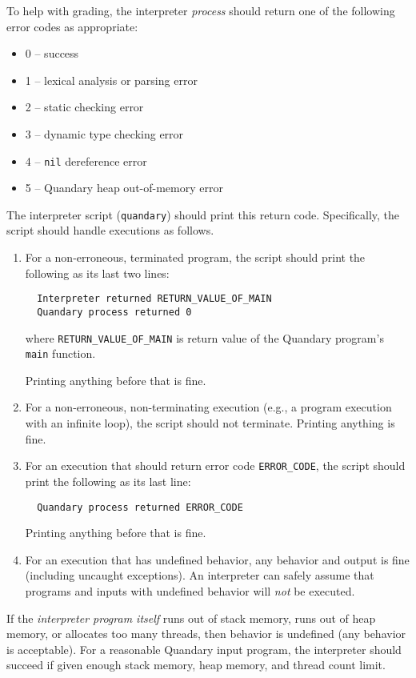 \documentclass[10pt]{article}
\newcommand{\tm}[1]{\texttt{#1}}
\begin{document}
To help with grading, the interpreter \emph{process} should return one of the following error codes as appropriate:

\begin{itemize}
\item 0 -- success
\item 1 -- lexical analysis or parsing error
\item 2 -- static checking error
\item 3 -- dynamic type checking error
\item 4 -- \tm{nil} dereference error
\item 5 -- Quandary heap out-of-memory error
\end{itemize}
The interpreter script (\texttt{quandary}) should print this return code.
Specifically, the script should handle executions as follows.

\begin{enumerate}

\item For a non-erroneous, terminated program,
the script should print the following as its last two lines:
\begin{verbatim}
  Interpreter returned RETURN_VALUE_OF_MAIN
  Quandary process returned 0
\end{verbatim}
where \texttt{RETURN\_VALUE\_OF\_MAIN} is return value of the Quandary program's \texttt{main} function.

Printing anything before that is fine.

\item For a non-erroneous, non-terminating execution (e.g., a program execution with an infinite loop),
the script should not terminate. Printing anything is fine.

\item For an execution that should return error code \texttt{ERROR\_CODE},
the script should print the following as its last line:
\begin{verbatim}
  Quandary process returned ERROR_CODE
\end{verbatim}
Printing anything before that is fine.

\item For an execution that has undefined behavior, any behavior and output is fine (including uncaught exceptions).
An interpreter can safely assume that programs and inputs with undefined behavior will \emph{not} be executed.

\end{enumerate}
If the \emph{interpreter program itself} runs out of stack memory,
runs out of heap memory, or allocates too many threads,
then behavior is undefined (any behavior is acceptable).
For a reasonable Quandary input program,
the interpreter should succeed if given enough stack memory,
heap memory, and thread count limit.
\end{document}
